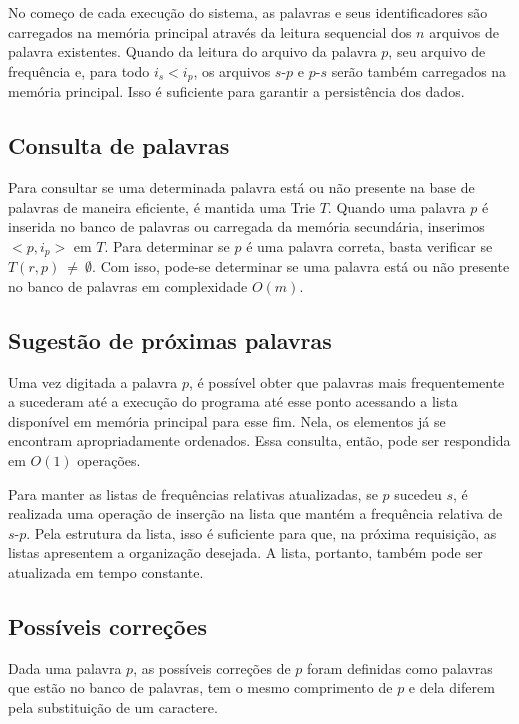 \documentclass[12pt]{article}
\begin{document}
    No começo de cada execução do sistema, as palavras e seus identificadores são carregados na memória principal através da leitura sequencial dos $n$ arquivos de palavra existentes.
    Quando da leitura do arquivo da palavra $p$, seu arquivo de frequência e, para todo $i_s < i_p$, os arquivos $s$-$p$ e $p$-$s$ serão também carregados na memória principal.
    Isso é suficiente para garantir a persistência dos dados.

    \subsection{Consulta de palavras}
    Para consultar se uma determinada palavra está ou não presente na base de palavras de maneira eficiente, é mantida uma Trie $T$.
    Quando uma palavra $p$ é inserida no banco de palavras ou carregada da memória secundária, inserimos $<p, i_p>$ em $T$.
    Para determinar se $p$ é uma palavra correta, basta verificar se $T(r, p)~\ne~\emptyset$.
    Com isso, pode-se determinar se uma palavra está ou não presente no banco de palavras em complexidade $O(m)$.

    \subsection{Sugestão de próximas palavras}
    Uma vez digitada a palavra $p$, é possível obter que palavras mais frequentemente a sucederam até a execução do programa até esse ponto acessando a lista disponível em memória principal para esse fim.
    Nela, os elementos já se encontram apropriadamente ordenados.
    Essa consulta, então, pode ser respondida em $O(1)$ operações.

    Para manter as listas de frequências relativas atualizadas, se $p$ sucedeu $s$, é realizada uma operação de inserção na lista que mantém a frequência relativa de $s$-$p$.
    Pela estrutura da lista, isso é suficiente para que, na próxima requisição, as listas apresentem a organização desejada.
    A lista, portanto, também pode ser atualizada em tempo constante.

    \subsection{Possíveis correções}
    Dada uma palavra $p$, as possíveis correções de $p$ foram definidas como palavras que estão no banco de palavras, tem o mesmo comprimento de $p$ e dela diferem pela substituição de um caractere.
\end{document}

